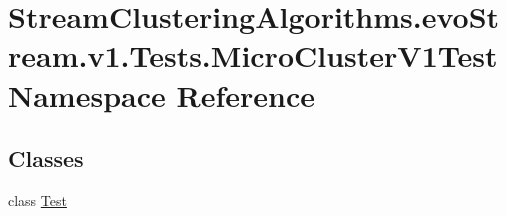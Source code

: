 \hypertarget{namespaceStreamClusteringAlgorithms_1_1evoStream_1_1v1_1_1Tests_1_1MicroClusterV1Test}{}\section{Stream\+Clustering\+Algorithms.\+evo\+Stream.\+v1.\+Tests.\+Micro\+Cluster\+V1\+Test Namespace Reference}
\label{namespaceStreamClusteringAlgorithms_1_1evoStream_1_1v1_1_1Tests_1_1MicroClusterV1Test}
\subsection*{Classes}
\begin{DoxyCompactItemize}
\item 
class \hyperlink{classStreamClusteringAlgorithms_1_1evoStream_1_1v1_1_1Tests_1_1MicroClusterV1Test_1_1Test}{Test}
\end{DoxyCompactItemize}
